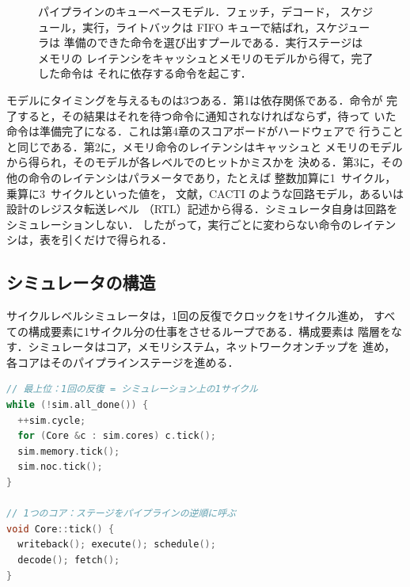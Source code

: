 \documentclass[../main.tex]{subfiles}
\begin{document}
\begin{figure}[tb]
  \centering
  
  \caption{パイプラインのキューベースモデル．フェッチ，デコード，
    スケジュール，実行，ライトバックは FIFO キューで結ばれ，スケジューラは
    準備のできた命令を選び出すプールである．実行ステージはメモリの
    レイテンシをキャッシュとメモリのモデルから得て，完了した命令は
    それに依存する命令を起こす．}
  \label{fig:l08-queue-model}
\end{figure}

モデルにタイミングを与えるものは3つある．第1は依存関係である．命令が
完了すると，その結果はそれを待つ命令に通知されなければならず，待って
いた命令は準備完了になる．これは第4章のスコアボードがハードウェアで
行うことと同じである．第2に，メモリ命令のレイテンシはキャッシュと
メモリのモデルから得られ，そのモデルが各レベルでのヒットかミスかを
決める．第3に，その他の命令のレイテンシはパラメータであり，たとえば
整数加算に\num{1}~サイクル，乗算に\num{3}~サイクルといった値を，
文献，CACTI のような回路モデル，あるいは設計のレジスタ転送レベル
（RTL）記述から得る．シミュレータ自身は回路をシミュレーションしない．
したがって，実行ごとに変わらない命令のレイテンシは，表を引くだけで得られる．

\subsection{シミュレータの構造}

サイクルレベルシミュレータは，1回の反復でクロックを1サイクル進め，
すべての構成要素に1サイクル分の仕事をさせるループである．構成要素は
階層をなす．シミュレータはコア，メモリシステム，ネットワークオンチップを
進め，各コアはそのパイプラインステージを進める．

\begin{lstlisting}[language=C++, numbers=none]
// 最上位：1回の反復 = シミュレーション上の1サイクル
while (!sim.all_done()) {
  ++sim.cycle;
  for (Core &c : sim.cores) c.tick();
  sim.memory.tick();
  sim.noc.tick();
}

// 1つのコア：ステージをパイプラインの逆順に呼ぶ
void Core::tick() {
  writeback(); execute(); schedule();
  decode(); fetch();
}
\end{lstlisting}
\end{document}
